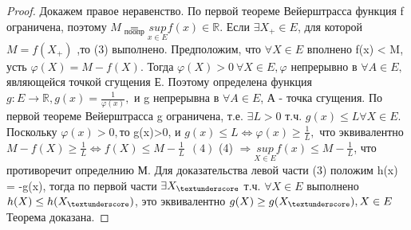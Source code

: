 \begin{proof}
	Докажем правое неравенство. По первой теореме Вейерштрасса функция f ограничена, поэтому $M \underset{по опр}{=} \underset{x \in E}{sup}f(x) \in \mathbb{R}$. Если $\exists X_{+} \in E$, для которой $M = f(X_{+})$
,то (3) выполнено. Предположим, что $\forall X \in E$ вполнено f(x) < M, усть $\varphi(X) = M - f(X)$. Тогда $\varphi(X) > 0 \ \forall X \in E, \varphi$ непрерывно в $\forall A \in E,$ являющейся точкой сгущения Е. Поэтому определена функция $g: E \to \mathbb{R}, g(x) = \frac{1}{\varphi(x)},$ и g непрерывна в $\forall A \in E$, А - точка сгущения. По первой теореме Вейерштрасса g ограничена, т.е. $\exists L > 0$ т.ч. $g(x) \leq L \forall X \in E$. Поскольку $\varphi(x) > 0, $то g(x)>0, и $g(x) \leq L \Leftrightarrow \varphi(x) \geq \frac{1}{L},$ что эквивалентно $M - f(X) \geq \frac{1}{L} \Leftrightarrow f(X) \leq M - \frac{1}{L} \ \ (4)$
 (4) $\Rightarrow \underset{X \in E}{sup}f(x) \leq M - \frac{1}{L}$, что противоречит определнию М. Для доказательства левой части (3) положим h(x) = -g(x), тогда по первой части $\exists X_{\textunderscore}$ т.ч. $\forall X \in E$ выполнено $h(X) \leq h(X_{\textunderscore})$, это эквивалентно $g(X) \geq g(X_{\textunderscore}), X \in E$ Теорема доказана.
\end{proof}
